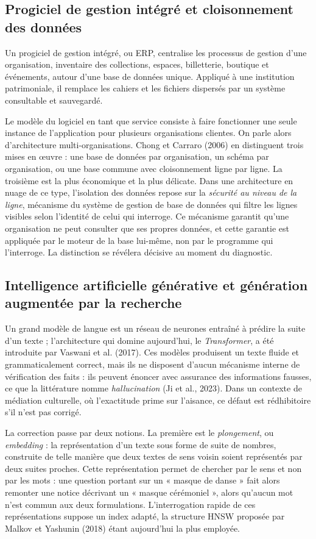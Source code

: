 \subsection{Progiciel de gestion intégré et cloisonnement des données}

Un progiciel de gestion intégré, ou ERP, centralise les processus de gestion
d'une organisation, inventaire des collections, espaces, billetterie, boutique
et événements, autour d'une base de données unique. Appliqué à une institution
patrimoniale, il remplace les cahiers et les fichiers dispersés par un système
consultable et sauvegardé.

Le modèle du logiciel en tant que service consiste à faire fonctionner une seule
instance de l'application pour plusieurs organisations clientes. On parle alors
d'architecture multi-organisations. Chong et Carraro (2006) en distinguent trois
mises en œuvre : une base de données par organisation, un schéma par
organisation, ou une base commune avec cloisonnement ligne par ligne. La
troisième est la plus économique et la plus délicate. Dans une architecture en
nuage de ce type, l'isolation des données repose sur la \emph{sécurité au niveau
de la ligne}, mécanisme du système de gestion de base de données qui filtre les
lignes visibles selon l'identité de celui qui interroge. Ce mécanisme garantit
qu'une organisation ne peut consulter que ses propres données, et cette garantie
est appliquée par le moteur de la base lui-même, non par le programme qui
l'interroge. La distinction se révélera décisive au moment du diagnostic.

\subsection{Intelligence artificielle générative et génération augmentée par la recherche}

Un grand modèle de langue est un réseau de neurones entraîné à prédire la suite
d'un texte ; l'architecture qui domine aujourd'hui, le \emph{Transformer}, a été
introduite par Vaswani et al. (2017). Ces modèles produisent un texte fluide et
grammaticalement correct, mais ils ne disposent d'aucun mécanisme interne de
vérification des faits : ils peuvent énoncer avec assurance des informations
fausses, ce que la littérature nomme \emph{hallucination} (Ji et al., 2023).
Dans un contexte de médiation culturelle, où l'exactitude prime sur l'aisance,
ce défaut est rédhibitoire s'il n'est pas corrigé.

La correction passe par deux notions. La première est le \emph{plongement}, ou
\emph{embedding} : la représentation d'un texte sous forme de suite de nombres,
construite de telle manière que deux textes de sens voisin soient représentés
par deux suites proches. Cette représentation permet de chercher par le sens et
non par les mots : une question portant sur un « masque de danse » fait alors
remonter une notice décrivant un « masque cérémoniel », alors qu'aucun mot n'est
commun aux deux formulations. L'interrogation rapide de ces représentations
suppose un index adapté, la structure HNSW proposée par Malkov et Yashunin
(2018) étant aujourd'hui la plus employée.

